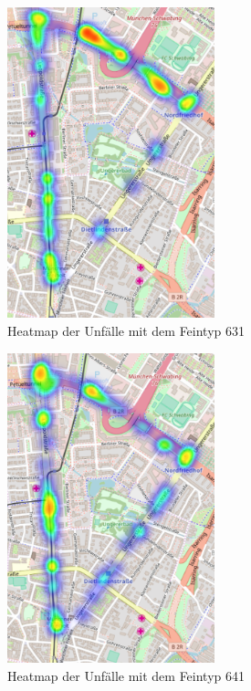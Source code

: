 \begin{savenotes}
	\begin{figure}[H]
		\centering
		\includegraphics[width=6cm,height=9cm]{figures/HM_631}
		\caption[Heatmap der Unfälle mit dem Feintyp 631]{Heatmap der Unfälle mit dem Feintyp 631}\label{fig:Heatmap_631}
	\end{figure}
\end{savenotes}

\begin{savenotes}
	\begin{figure}[H]
		\centering
		\includegraphics[width=6cm,height=9cm]{figures/HM_641}
		\caption[Heatmap der Unfälle mit dem Feintyp 641]{Heatmap der Unfälle mit dem Feintyp 641}\label{fig:Heatmap_641}
	\end{figure}
\end{savenotes}

